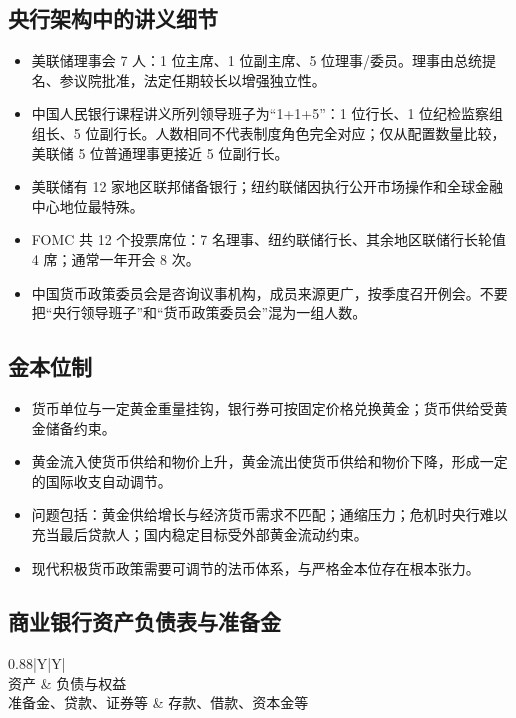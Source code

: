 \documentclass[UTF8,11pt,a4paper]{ctexart}
\begin{document}
\subsection{央行架构中的讲义细节}
\begin{detailbox}[组织结构要分层记忆]
\begin{itemize}
  \item 美联储理事会 7 人：1 位主席、1 位副主席、5 位理事/委员。理事由总统提名、参议院批准，法定任期较长以增强独立性。
  \item 中国人民银行课程讲义所列领导班子为“1+1+5”：1 位行长、1 位纪检监察组组长、5 位副行长。人数相同不代表制度角色完全对应；仅从配置数量比较，美联储 5 位普通理事更接近 5 位副行长。
  \item 美联储有 12 家地区联邦储备银行；纽约联储因执行公开市场操作和全球金融中心地位最特殊。
  \item FOMC 共 12 个投票席位：7 名理事、纽约联储行长、其余地区联储行长轮值 4 席；通常一年开会 8 次。
  \item 中国货币政策委员会是咨询议事机构，成员来源更广，按季度召开例会。不要把“央行领导班子”和“货币政策委员会”混为一组人数。
\end{itemize}
\end{detailbox}

\subsection{金本位制}
\begin{itemize}
  \item 货币单位与一定黄金重量挂钩，银行券可按固定价格兑换黄金；货币供给受黄金储备约束。
  \item 黄金流入使货币供给和物价上升，黄金流出使货币供给和物价下降，形成一定的国际收支自动调节。
  \item 问题包括：黄金供给增长与经济货币需求不匹配；通缩压力；危机时央行难以充当最后贷款人；国内稳定目标受外部黄金流动约束。
  \item 现代积极货币政策需要可调节的法币体系，与严格金本位存在根本张力。
\end{itemize}

\subsection{商业银行资产负债表与准备金}
\begin{center}
\begin{tabularx}{0.88\linewidth}{|Y|Y|}
\hline
{}\\
\hline
资产 & 负债与权益\\
\hline
准备金、贷款、证券等 & 存款、借款、资本金等\\
\hline
\end{tabularx}
\end{center}
\end{document}
